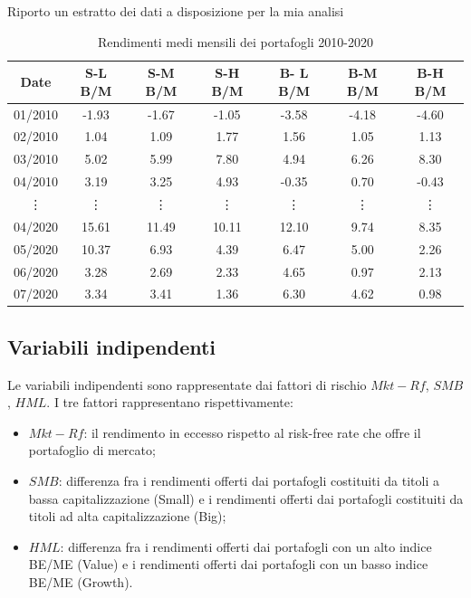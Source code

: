Riporto un estratto dei dati a disposizione per la mia analisi
\begin{table}[h]
	\begin{center}
	\begin{tabular}{ccccccc}
		\toprule
		Date          & S-L B/M  & S-M B/M & S-H B/M  & B- L B/M & B-M B/M & B-H B/M \\
		\midrule
		01/2010 & 	-1.93 & -1.67 & -1.05& -3.58 & -4.18 & -4.60 \\
		02/2010 & 1.04 &	1.09&1.77	&	1.56 &1.05	&	1.13\\
		03/2010  & 5.02 &	5.99 &    7.80& 4.94	&	6.26&	8.30\\
		04/2010  & 3.19 &	3.25 &4.93 &-0.35 &0.70	&-0.43	\\
		\vdots & \vdots & \vdots & \vdots & \vdots & \vdots & \vdots\\
		04/2020 & 15.61  & 11.49 & 10.11 &12.10  &9.74 &8.35\\
		05/2020 & 10.37	& 6.93	&  4.39   &6.47 	& 5.00    & 2.26 \\
		06/2020 & 3.28	&   2.69 & 2.33 & 4.65 &0.97 & 2.13\\
		07/2020 & 3.34	&   3.41 &1.36 & 6.30&	4.62&0.98\\	\hline
	\end{tabular}
	\caption{Rendimenti medi mensili dei portafogli 2010-2020}
	\label{tab:truthTables}  
		\end{center} 
\end{table}
\subsection{Variabili indipendenti}
Le variabili indipendenti sono rappresentate dai fattori di rischio $Mkt-Rf$, $SMB$,  $HML$. I tre fattori rappresentano rispettivamente:

\begin{itemize}
	\item $Mkt-Rf$: il rendimento in eccesso rispetto al risk-free rate che offre il portafoglio di mercato;
	\item $SMB$: differenza fra i rendimenti offerti dai portafogli costituiti da titoli a bassa capitalizzazione (Small) e i rendimenti offerti dai portafogli costituiti da titoli ad alta capitalizzazione (Big); 
	\item $HML$: differenza fra i rendimenti offerti dai portafogli con un alto indice BE/ME (Value) e i rendimenti offerti dai portafogli con un basso indice BE/ME (Growth).
\end{itemize}

